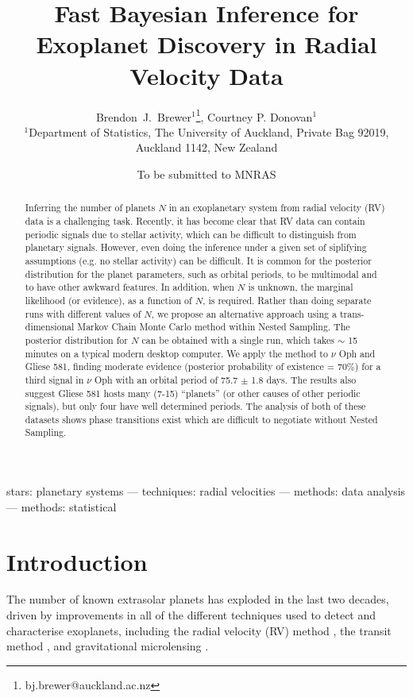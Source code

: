 \documentclass[useAMS,usenatbib]{mn2e}
\title[]
{Fast Bayesian Inference for Exoplanet Discovery in Radial Velocity Data}
\author[Brewer and Donovan]{%
  Brendon~J.~Brewer$^{1}$\thanks{bj.brewer@auckland.ac.nz},
  Courtney P. Donovan$^{1}$
  \medskip\\
  $^1$Department of Statistics, The University of Auckland, Private Bag 92019, Auckland 1142, New Zealand}
\begin{document}
             
\date{To be submitted to MNRAS}
             
\maketitle

\label{firstpage}


\begin{abstract}
Inferring the number of planets $N$ in an exoplanetary system from radial velocity
(RV) data is a challenging task. Recently, it has become clear that RV data
can contain periodic signals due to stellar activity, which can be difficult
to distinguish from planetary signals. However, even doing the inference
under a given set of siplifying assumptions (e.g. no stellar activity) can
be difficult. It is common for the posterior distribution for the
planet parameters, such as orbital periods,
to be multimodal and to have other awkward features. In
addition, when $N$ is unknown, the marginal likelihood (or evidence), as a
function of $N$, is required. Rather than doing separate runs with different
values of $N$, we propose an alternative
approach using a trans-dimensional Markov Chain Monte Carlo method within
Nested Sampling. The posterior distribution for $N$ can be obtained with a
single run, which takes $\sim$ 15 minutes on a typical modern desktop computer.
We apply the method to $\nu$ Oph and Gliese 581, finding moderate evidence
(posterior probability of existence = 70\%) for a third signal in
$\nu$ Oph with an orbital period of 75.7 $\pm$ 1.8 days. The results also
suggest Gliese 581 hosts many (7-15) ``planets'' (or other causes of other periodic
signals), but only four have well determined periods. The analysis of both
of these datasets shows phase transitions exist which are difficult to
negotiate without Nested Sampling.
\end{abstract}

\begin{keywords}
stars: planetary systems --- techniques: radial velocities ---
methods: data analysis --- methods: statistical
\end{keywords}


\section{Introduction}
The number of known extrasolar planets has exploded in the last two
decades, driven by improvements in
all of the different techniques used to detect and characterise exoplanets,
including the radial velocity (RV) method \citep[e.g.][]{2012PASJ...64..135S},
the transit method \citep[e.g.]{2014PNAS..11112647B},
and gravitational microlensing
\citep[e.g.][]{2014ApJ...785..155B, 2014ApJ...790...14Y}.
\end{document}
